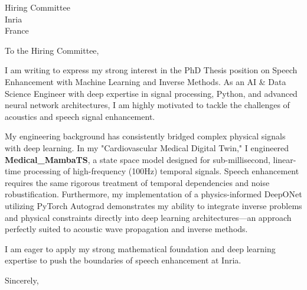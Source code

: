 \documentclass[11pt,a4paper]{letter}
\begin{document}
\begin{letter}{
    Hiring Committee \\
    Inria \\
    France
}
\opening{To the Hiring Committee,}

I am writing to express my strong interest in the PhD Thesis position on Speech Enhancement with Machine Learning and Inverse Methods. As an AI \& Data Science Engineer with deep expertise in signal processing, Python, and advanced neural network architectures, I am highly motivated to tackle the challenges of acoustics and speech signal enhancement.

My engineering background has consistently bridged complex physical signals with deep learning. In my "Cardiovascular Medical Digital Twin," I engineered \textbf{Medical\_MambaTS}, a state space model designed for sub-millisecond, linear-time processing of high-frequency (100Hz) temporal signals. Speech enhancement requires the same rigorous treatment of temporal dependencies and noise robustification. Furthermore, my implementation of a physics-informed DeepONet utilizing PyTorch Autograd demonstrates my ability to integrate inverse problems and physical constraints directly into deep learning architectures—an approach perfectly suited to acoustic wave propagation and inverse methods.

I am eager to apply my strong mathematical foundation and deep learning expertise to push the boundaries of speech enhancement at Inria.

\closing{Sincerely,}
\end{letter}
\end{document}
